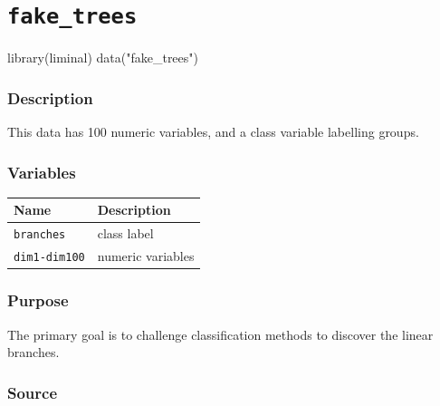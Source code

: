 \documentclass[
  letterpaper,
]{krantz}
\newenvironment{Shaded}{\begin{snugshade}}{\end{snugshade}}
\newcommand{\FunctionTok}[1]{\textcolor[rgb]{0.28,0.35,0.67}{#1}}
\newcommand{\NormalTok}[1]{\textcolor[rgb]{0.00,0.23,0.31}{#1}}
\newcommand{\StringTok}[1]{\textcolor[rgb]{0.13,0.47,0.30}{#1}}
\newcounter{none} %
\begin{document}
\section{\texorpdfstring{\texttt{fake\_trees}}{fake\_trees}}\label{fake_trees}

\begin{Shaded}
\begin{Highlighting}[]
\FunctionTok{library}\NormalTok{(liminal)}
\FunctionTok{data}\NormalTok{(}\StringTok{"fake\_trees"}\NormalTok{)}
\end{Highlighting}
\end{Shaded}

\subsubsection*{Description}\label{description-6}

This data has 100 numeric variables, and a class variable labelling
groups.

\subsubsection*{Variables}\label{variables-6}

{\def\LTcaptype{none} %
\begin{longtable}[]{@{}ll@{}}
\toprule\noalign{}
Name & Description \\
\midrule\noalign{}
\endhead
\bottomrule\noalign{}
\endlastfoot
\texttt{branches} & class label \\
\texttt{dim1-dim100} & numeric variables \\
\end{longtable}
}

\subsubsection*{Purpose}\label{purpose-6}

The primary goal is to challenge classification methods to discover the
linear branches.

\subsubsection*{Source}\label{source-6}
\end{document}
